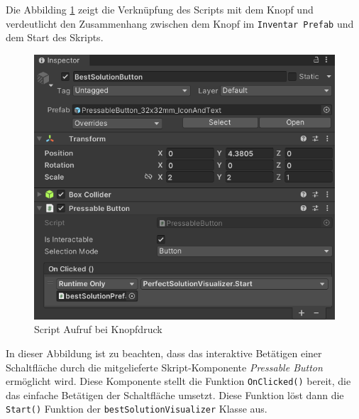 \begin{itemize}
Die Abbilding \ref{fig:ScrAuf} zeigt die Verknüpfung des Scripts mit dem Knopf und verdeutlicht den Zusammenhang zwischen
dem Knopf im \texttt{Inventar Prefab} und dem Start des Skripts.

\begin{figure}[H]
    \centering
    \includegraphics[scale=0.8]{images/perfSolBut}
    \caption{Script Aufruf bei Knopfdruck}
    \label{fig:ScrAuf}
\end{figure}

In dieser Abbildung ist zu beachten, dass das interaktive Betätigen einer Schaltfläche durch die mitgelieferte Skript-Komponente
\textit{Pressable Button} ermöglicht wird. Diese Komponente stellt die Funktion \texttt{OnClicked()} bereit, die das
einfache Betätigen der Schaltfläche umsetzt. Diese Funktion löst dann die \texttt{Start()} Funktion der \texttt{bestSolutionVisualizer}
Klasse aus.


\end{itemize}
